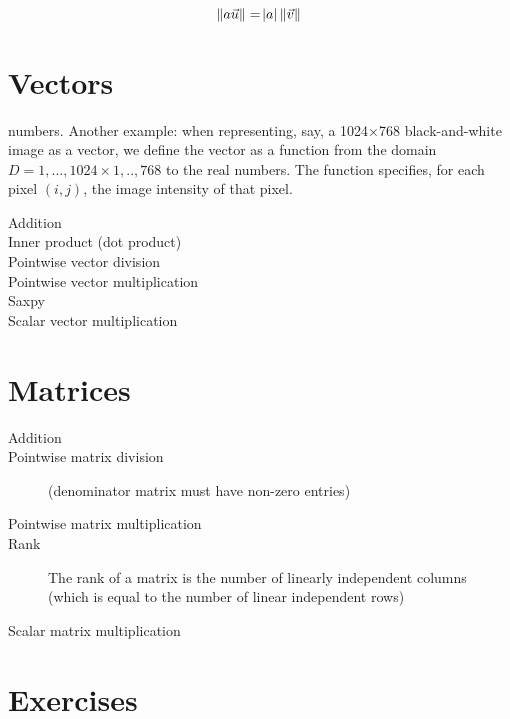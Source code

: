 \[ 
\norm{a \vec{u}} = \abs{a} \, \norm{\vec{v}} 
\]

\section{Vectors}
numbers. Another example: when representing, say, a  1024×768 black-and-white image as a vector, we define the vector as a function from the domain $D = {1,..., 1024} × {1, .., 768}$ to the real numbers. The function specifies, for each pixel $(i, j)$, the image intensity of that pixel. 

\begin{description}
    \item[Addition]
    \item[Inner product (dot product)]
    \item[Pointwise vector division]
    \item[Pointwise vector multiplication]
    \item[Saxpy]
    \item[Scalar vector multiplication]
\end{description}

\section{Matrices}
\begin{description}
    \item[Addition]
    \item[Pointwise matrix division] (denominator matrix must have non-zero entries)
    \item[Pointwise matrix multiplication]
    \item[Rank] The rank of a matrix is the number of linearly independent columns (which is equal to the number of linear independent rows)
    \item[Scalar matrix multiplication]
\end{description}

\section{Exercises}
\begin{ExerciseList}
\end{ExerciseList}
